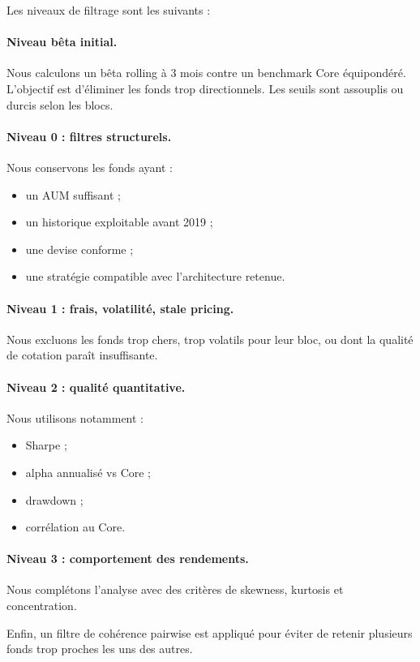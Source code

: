 \documentclass{article}
\begin{document}
Les niveaux de filtrage sont les suivants :

\paragraph{Niveau bêta initial.}
Nous calculons un bêta rolling à 3 mois contre un benchmark Core équipondéré. L’objectif est d’éliminer les fonds trop directionnels. Les seuils sont assouplis ou durcis selon les blocs.

\paragraph{Niveau 0 : filtres structurels.}
Nous conservons les fonds ayant :
\begin{itemize}
    \item un AUM suffisant ;
    \item un historique exploitable avant 2019 ;
    \item une devise conforme ;
    \item une stratégie compatible avec l’architecture retenue.
\end{itemize}

\paragraph{Niveau 1 : frais, volatilité, stale pricing.}
Nous excluons les fonds trop chers, trop volatils pour leur bloc, ou dont la qualité de cotation paraît insuffisante.

\paragraph{Niveau 2 : qualité quantitative.}
Nous utilisons notamment :
\begin{itemize}
    \item Sharpe ;
    \item alpha annualisé vs Core ;
    \item drawdown ;
    \item corrélation au Core.
\end{itemize}

\paragraph{Niveau 3 : comportement des rendements.}
Nous complétons l’analyse avec des critères de skewness, kurtosis et concentration.

Enfin, un filtre de cohérence pairwise est appliqué pour éviter de retenir plusieurs fonds trop proches les uns des autres.
\end{document}
